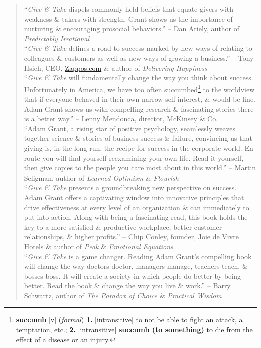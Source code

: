 \documentclass[oneside]{book}
\numberwithin{equation}{section}
\begin{document}
\begin{quotation}
	``\textit{Give \& Take} dispels commonly held beliefs that equate givers with weakness \& takers with strength. Grant shows us the importance of nurturing \& encouraging prosocial behaviors.'' -- Dan Ariely, author of \textit{Predictably Irrational}\\
	
	``\textit{Give \& Take} defines a road to success marked by new ways of relating to colleagues \& customers as well as new ways of growing a business.'' -- Tony Hsieh, CEO, \url{Zappos.com} \& author of \textit{Delivering Happiness}\\
	
	``\textit{Give \& Take} will fundamentally change the way you think about success. Unfortunately in America, we have too often succumbed\footnote{\textbf{succumb} [v] (\textit{formal}) \textbf{1.} [intransitive] to not be able to fight an attack, a temptation, etc.; \textbf{2.} [intransitive] \textbf{succumb (to something)} to die from the effect of a disease or an injury.} to the worldview that if everyone behaved in their own narrow self-interest, \& would be fine. Adam Grant shows us with compelling research \& fascinating stories there is a better way.'' -- Lenny Mendonca, director, McKinsey \& Co.\\
	
	``Adam Grant, a rising star of positive psychology, seamlessly weaves together science \& stories of business success \& failure, convincing us that giving is, in the long run, the recipe for success in the corporate world. En route you will find yourself reexamining your own life. Read it yourself, then give copies to the people you care most about in this world.'' -- Martin Seligman, author of \textit{Learned Optimism} \& \textit{Flourish}\\
	
	``\textit{Give \& Take} presents a groundbreaking new perspective on success. Adam Grant offers a captivating window into innovative principles that drive effectiveness at every level of an organization \& can immediately to put into action. Along with being a fascinating read, this book holds the key to a more satisfied \& productive workplace, better customer relationships, \& higher profits.'' -- Chip Conley, founder, Joie de Vivre Hotels \& author of \textit{Peak} \& \textit{Emotional Equations}\\
	
	``\textit{Give \& Take} is a game changer. Reading Adam Grant's compelling book will change the way doctors doctor, managers manage, teachers teach, \& bosses boss. It will create a society in which people do better by being better. Read the book \& change the way you live \& work.'' -- Barry Schwartz, author of \textit{The Paradox of Choice} \& \textit{Practical Wisdom}\\
	

\end{quotation}
\end{document}
